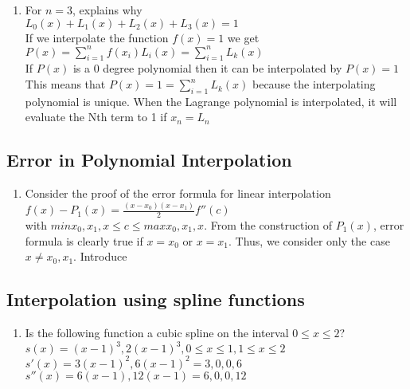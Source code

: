 \documentclass[12pt,letterpaper]{article}
\begin{document}
\begin{enumerate}
\begin{enumerate}
		\end{enumerate} 
		\item[11.] \begin{enumerate} 
			\item For $n = 3$, explains why \\
				$L_{0}(x) + L_{1}(x) + L_{2}(x) + L_{3}(x) = 1$ \\
				If we interpolate the function $f(x) = 1$ we get \\
				$P(x) = \sum_{i=1}^{n}f(x_{i})L_{i}(x) = \sum_{i=1}^{n} L_{k}(x)$ \\
				If $P(x)$ is a $0$ degree polynomial then it can be interpolated by $P(x) = 1$ \\
				This means that $P(x) = 1 = \sum_{i=1}^{n} L_{k}(x)$  because the interpolating polynomial is unique. When the Lagrange polynomial is interpolated, it will evaluate the Nth term to 1 if $x_{n} = L_{n}$  \\		
		\end{enumerate} 
		
		
\subsection{Error in Polynomial Interpolation} 
	\begin{enumerate} 
		\item[18.] Consider the proof of the error formula for linear interpolation \\
			$f(x) - P_{1}(x) = \frac{(x - x_{0})(x - x_{1})}{2}f''(c)$ \\
		with $min {x_{0}, x_{1}, x} \leq c \leq max {x_{0}, x_{1}, x} $. From the construction of $P_{1}(x)$, error formula is clearly true if $x = x_{0}$ or $x = x_{1}$. Thus, we consider only the case $x \neq x_{0}, x_{1}$. Introduce \\
	

	\end{enumerate}	

\subsection{Interpolation using spline functions} 
	\begin{enumerate} 
		\item[10.] Is the following function a cubic spline on the interval $0 \leq x \leq 2$? \\
			$s(x) =  (x - 1)^{3}, 2(x - 1)^{3}, 0 \leq x \leq 1, 1 \leq x \leq 2$ \\
			$s'(x) = 3(x - 1)^{2}, 6(x - 1)^{2} = {3,0}, {0,6}$  \\ 
			$s''(x) = 6(x - 1), 12(x - 1) = {6,0}, {0, 12}$ \\
		
			
	\end{enumerate}
			
\end{document}
